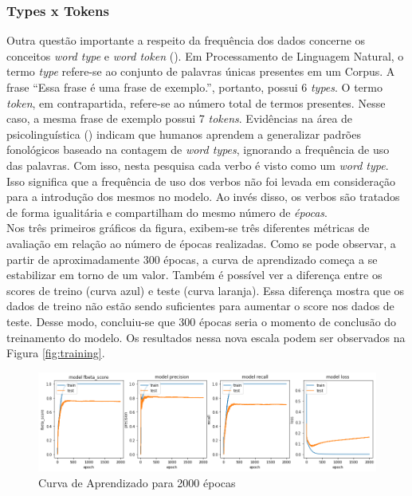 \subsubsection{Types x Tokens}
Outra questão importante a respeito da frequência dos dados concerne os conceitos \textit{word type} e \textit{word token} (\cite{Manning:1999}).   
Em Processamento de Linguagem Natural, o termo \textit{type} refere-se ao conjunto de palavras únicas presentes em um Corpus. A frase “Essa frase é uma frase de exemplo.”, portanto, possui 6 \textit{types}. O termo \textit{token}, em contrapartida, refere-se ao número total de termos presentes. Nesse caso, a mesma frase de exemplo possui 7 \textit{tokens}. Evidências na área de psicolinguística (\cite{Bybee:1995,janet:2018}) indicam que humanos aprendem a generalizar padrões fonológicos baseado na contagem de \textit{word types}, ignorando a frequência de uso das palavras. Com isso, nesta pesquisa cada verbo é visto como um \textit{word type}. Isso significa que a frequência de uso dos verbos não foi levada em consideração para a introdução dos mesmos no modelo. Ao invés disso, os verbos são tratados de forma igualitária e compartilham do mesmo número de \textit{épocas}.\\


Nos três primeiros gráficos da figura, exibem-se três diferentes métricas de avaliação em relação ao número de épocas realizadas. 
Como se pode observar, a partir de aproximadamente 300 épocas, a curva de aprendizado começa a se estabilizar em torno de um valor. Também é possível ver a diferença entre os scores de treino (curva azul) e teste (curva laranja). Essa diferença mostra que os dados de treino não estão sendo suficientes para aumentar o score nos dados de teste. Desse modo, concluiu-se que 300 épocas seria o momento de conclusão do treinamento do modelo. Os resultados nessa nova escala podem ser observados na Figura \ref{fig:training}.  

\begin{figure}[H]
  \centering
  \includegraphics[width=1.0\linewidth]{img/2000_precision.png}
  \caption{Curva de Aprendizado para 2000 épocas}
  \label{fig:training2000}
\end{figure}

